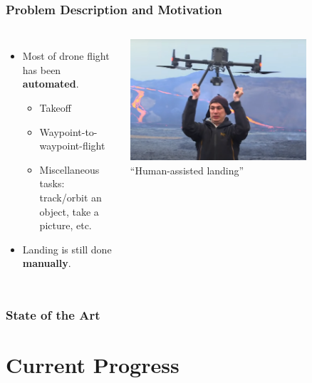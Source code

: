 \documentclass[aspectratio=169]{rubeamer}
\begin{document}
\begin{frame}
  \frametitle{Problem Description and Motivation}
  \begin{columns}
    \begin{itemize}
      \item Most of drone flight has been \textbf{automated}.
      \begin{itemize}
        \item Takeoff
        \item Waypoint-to-waypoint-flight
        \item Miscellaneous tasks: track/orbit an object, take a picture, etc.
      \end{itemize}
    \item Landing is still done \textbf{manually}.
    \end{itemize}
    \centering
    \includegraphics[width=0.75\textwidth]{human_assisted_landing}\\
    ``Human-assisted landing''
  \end{columns}
\end{frame}

\begin{frame}
  \frametitle{State of the Art}
\end{frame}

\section{Current Progress}
\end{document}
